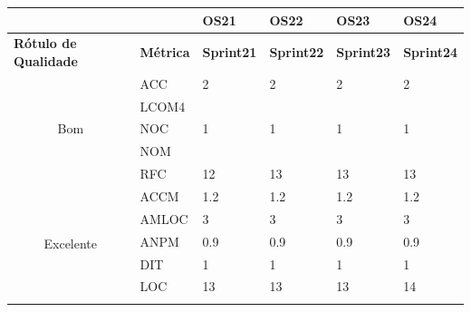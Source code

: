 \begin{table}[H]
\begin{tabular}{|c|l|l|l|l|l|}
\hline
\multicolumn{1}{|l|}{\textbf{}}                    & \textbf{}        & \textbf{OS21}      & \textbf{OS22}      & \textbf{OS23}      & \textbf{OS24}      \\ \hline
\multicolumn{1}{|l|}{\textbf{Rótulo de Qualidade}} & \textbf{Métrica} & \textbf{Sprint21} & \textbf{Sprint22} & \textbf{Sprint23} & \textbf{Sprint24} \\ \hline
\multirow{5}{*}{Bom}                               & ACC              & 2                  & 2                  & 2                  & 2                  \\ \cline{2-6} 
                                                   & LCOM4            &                    &                    &                    &                    \\ \cline{2-6} 
                                                   & NOC              & 1                  & 1                  & 1                  & 1                  \\ \cline{2-6} 
                                                   & NOM              &                    &                    &                    &                    \\ \cline{2-6} 
                                                   & RFC              & 12                 & 13                 & 13                 & 13                 \\ \hline
\multirow{7}{*}{Excelente}                         & ACCM             & 1.2                & 1.2                & 1.2                & 1.2                \\ \cline{2-6} 
                                                   & AMLOC            & 3                  & 3                  & 3                  & 3                  \\ \cline{2-6} 
                                                   & ANPM             & 0.9                & 0.9                & 0.9                & 0.9                \\ \cline{2-6} 
                                                   & DIT              & 1                  & 1                  & 1                  & 1                  \\ \cline{2-6} 
                                                   & LOC              & 13                 & 13                 & 13                 & 14                 \\ \cline{2-6} 

\end{tabular}
\end{table}
